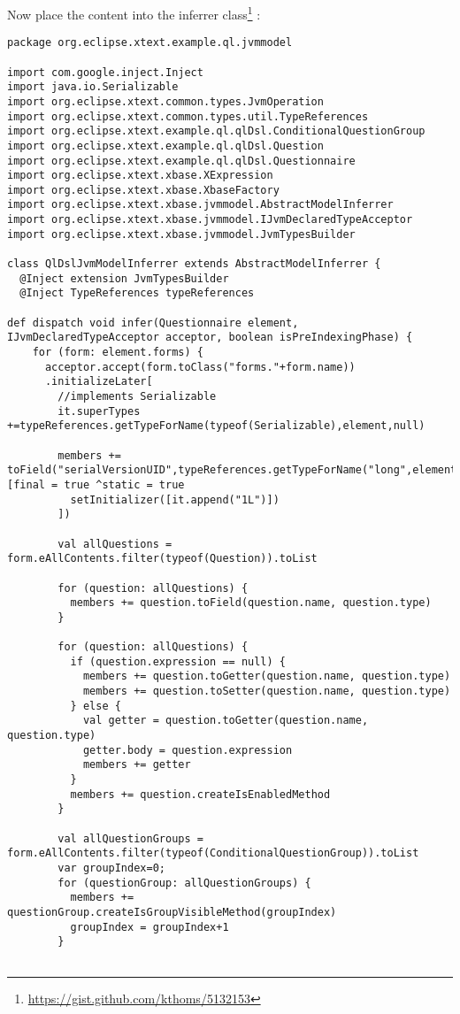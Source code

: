 Now place the content into the inferrer class\footnote{\url{https://gist.github.com/kthoms/5132153}}
: 
\begin{lstlisting}[language=Xtend]
package org.eclipse.xtext.example.ql.jvmmodel

import com.google.inject.Inject
import java.io.Serializable
import org.eclipse.xtext.common.types.JvmOperation
import org.eclipse.xtext.common.types.util.TypeReferences
import org.eclipse.xtext.example.ql.qlDsl.ConditionalQuestionGroup
import org.eclipse.xtext.example.ql.qlDsl.Question
import org.eclipse.xtext.example.ql.qlDsl.Questionnaire
import org.eclipse.xtext.xbase.XExpression
import org.eclipse.xtext.xbase.XbaseFactory
import org.eclipse.xtext.xbase.jvmmodel.AbstractModelInferrer
import org.eclipse.xtext.xbase.jvmmodel.IJvmDeclaredTypeAcceptor
import org.eclipse.xtext.xbase.jvmmodel.JvmTypesBuilder

class QlDslJvmModelInferrer extends AbstractModelInferrer {
  @Inject extension JvmTypesBuilder
  @Inject TypeReferences typeReferences

def dispatch void infer(Questionnaire element, IJvmDeclaredTypeAcceptor acceptor, boolean isPreIndexingPhase) {
    for (form: element.forms) {
      acceptor.accept(form.toClass("forms."+form.name))
      .initializeLater[
        //implements Serializable
        it.superTypes +=typeReferences.getTypeForName(typeof(Serializable),element,null)

        members += toField("serialVersionUID",typeReferences.getTypeForName("long",element),[final = true ^static = true 
          setInitializer([it.append("1L")])
        ])

        val allQuestions = form.eAllContents.filter(typeof(Question)).toList
        
        for (question: allQuestions) {
          members += question.toField(question.name, question.type)
        }

        for (question: allQuestions) {
          if (question.expression == null) {
            members += question.toGetter(question.name, question.type)
            members += question.toSetter(question.name, question.type)
          } else {
            val getter = question.toGetter(question.name, question.type)
            getter.body = question.expression
            members += getter
          }
          members += question.createIsEnabledMethod
        }

        val allQuestionGroups = form.eAllContents.filter(typeof(ConditionalQuestionGroup)).toList
        var groupIndex=0;
        for (questionGroup: allQuestionGroups) {
          members += questionGroup.createIsGroupVisibleMethod(groupIndex)
          groupIndex = groupIndex+1
        }


\end{lstlisting}
